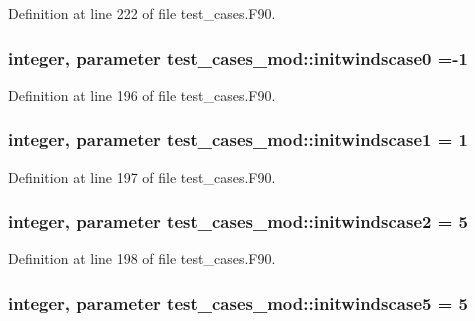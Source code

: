 Definition at line 222 of file test\-\_\-cases.\-F90.

\subsubsection[{initwindscase0}]{\setlength{\rightskip}{0pt plus 5cm}integer, parameter test\-\_\-cases\-\_\-mod\-::initwindscase0 =-\/1\hspace{0.3cm}{\ttfamily [private]}}\label{classtest__cases__mod_a344cd0cb1ee73dc4346c3291c532432f}


Definition at line 196 of file test\-\_\-cases.\-F90.

\subsubsection[{initwindscase1}]{\setlength{\rightskip}{0pt plus 5cm}integer, parameter test\-\_\-cases\-\_\-mod\-::initwindscase1 = 1\hspace{0.3cm}{\ttfamily [private]}}\label{classtest__cases__mod_ae0e779adc02d8de0967072c92e081e76}


Definition at line 197 of file test\-\_\-cases.\-F90.

\subsubsection[{initwindscase2}]{\setlength{\rightskip}{0pt plus 5cm}integer, parameter test\-\_\-cases\-\_\-mod\-::initwindscase2 = 5\hspace{0.3cm}{\ttfamily [private]}}\label{classtest__cases__mod_a67b8fe8f9c6ecc1f39e3efb965081229}


Definition at line 198 of file test\-\_\-cases.\-F90.

\subsubsection[{initwindscase5}]{\setlength{\rightskip}{0pt plus 5cm}integer, parameter test\-\_\-cases\-\_\-mod\-::initwindscase5 = 5\hspace{0.3cm}{\ttfamily [private]}}\label{classtest__cases__mod_ac567d8bd4c95a1655c612b3a193c1ea3}


